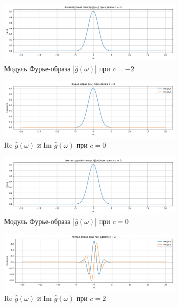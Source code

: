 \begin{figure}[H]
    \centering
    \includegraphics[width=0.8\textwidth]{g_hat_magnitude_c-2.png}
    \caption{Модуль Фурье-образа $|\hat{g}(\omega)|$ при $c = -2$}
\end{figure}

\begin{figure}[H]
    \centering
    \includegraphics[width=0.8\textwidth]{g_hat_complex_c0.png}
    \caption{Re $\hat{g}(\omega)$ и Im $\hat{g}(\omega)$ при $c = 0$}
\end{figure}

\begin{figure}[H]
    \centering
    \includegraphics[width=0.8\textwidth]{g_hat_magnitude_c0.png}
    \caption{Модуль Фурье-образа $|\hat{g}(\omega)|$ при $c = 0$}
\end{figure}

\begin{figure}[H]
    \centering
    \includegraphics[width=0.8\textwidth]{g_hat_complex_c2.png}
    \caption{Re $\hat{g}(\omega)$ и Im $\hat{g}(\omega)$ при $c = 2$}
\end{figure}

